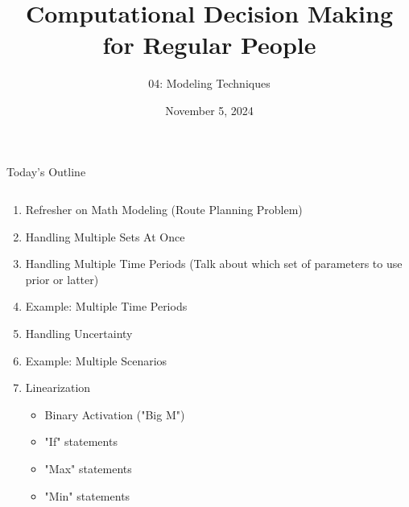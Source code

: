 \documentclass[10pt, aspectratio=169]{beamer}
\title{Computational Decision Making for Regular People}
\subtitle{04: Modeling Techniques}
\date{November 5, 2024}
\begin{document}
\begin{frame}
    \maketitle
\end{frame}

\begin{frame}{Today's Outline}
    \begin{columns}
        \begin{column}{0.5\textwidth}
            \begin{enumerate}
                \item Refresher on Math Modeling (Route Planning Problem)
                \item Handling Multiple Sets At Once
                \item Handling Multiple Time Periods (Talk about which set of parameters to use prior or latter)
                \item Example: Multiple Time Periods
                \item Handling Uncertainty
                \item Example: Multiple Scenarios
                \item Linearization
                \begin{itemize}
                    \item Binary Activation ("Big M")
                    \item "If" statements
                    \item "Max" statements
                    \item "Min" statements
                    

\end{itemize}
\end{enumerate}
\end{column}
\end{columns}
\end{frame}
\end{document}
